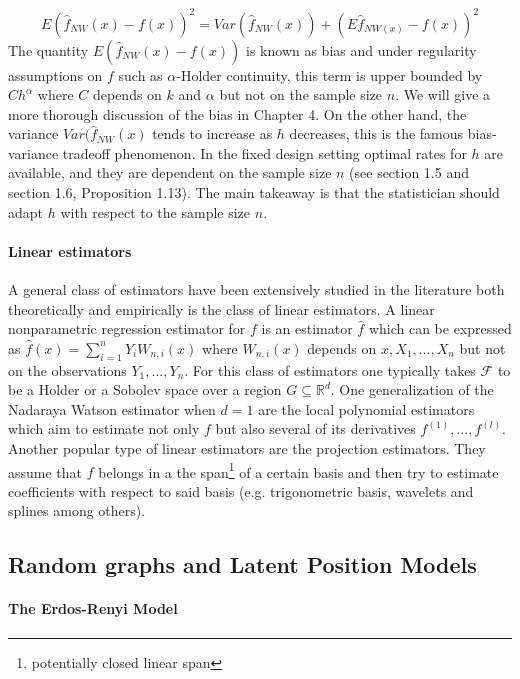 \documentclass{article}
\begin{document}
\begin{equation}
\label{eqn:bias-variance-decomp}
E(\hat{f}_{NW}(x)-f(x))^2=Var(\hat{f}_{NW}(x))+(E\hat{f}_{NW(x)}-f(x))^2
\end{equation}
The quantity $E(\hat{f}_{NW}(x)-f(x))$ is known as bias and under regularity assumptions on $f$ such as $\alpha$-Holder continuity, this term is upper bounded by $Ch^{\alpha}$ where $C$ depends on $k$ and $\alpha$ but not on the sample size $n$. We will give a more thorough discussion of the bias in Chapter 4. On the other hand, the variance $Var(\hat{f}_{NW}(x)$ tends to increase as $h$ decreases, this is the famous bias-variance tradeoff phenomenon. In the fixed design setting optimal rates for $h$ are available, and they are dependent on the sample size $n$ (see \cite{Tsybakov} section 1.5 and section 1.6, Proposition 1.13). The main takeaway is that the statistician should adapt $h$ with respect to the sample size $n$. 

\paragraph{Linear estimators}
A general class of estimators have been extensively studied in the literature both theoretically and empirically is the class of linear estimators. A linear nonparametric regression estimator for $f$ is an estimator $\hat{f}$ which can be expressed as $\hat{f}(x)=\sum_{i=1}^nY_iW_{n,i}(x)$ where $W_{n,i}(x)$ depends on $x,X_1,...,X_n$ but not on the observations $Y_1,...,Y_n$. For this class of estimators one typically takes $\mathcal{F}$ to be a Holder or a Sobolev space over a region $G\subseteq \mathbb{R}^d$. One generalization of the Nadaraya Watson estimator when $d=1$ are the local polynomial estimators which aim to estimate not only $f$ but also several of its derivatives $f^{(1)},...,f^{(l)}$. Another popular type of linear estimators are the projection estimators. They assume that $f$ belongs in a the span\footnote{potentially closed linear span} of a certain basis and then  try to estimate coefficients with respect to said basis (e.g. trigonometric basis, wavelets and  splines among others). 
\subsection{Random graphs and Latent Position Models}

\paragraph{The Erdos-Renyi Model}
\end{document}
